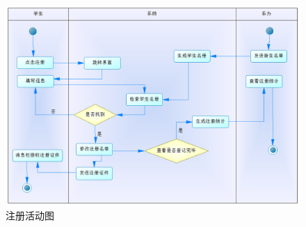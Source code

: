 \documentclass[12pt, a4paper, oneside]{ctexart}
\begin{document}
\begin{figure}[H]
    \centering
    \includegraphics[width = 1\textwidth]{../pic/3/3.1.png}
    \caption{注册活动图}
\end{figure}
\end{document}
